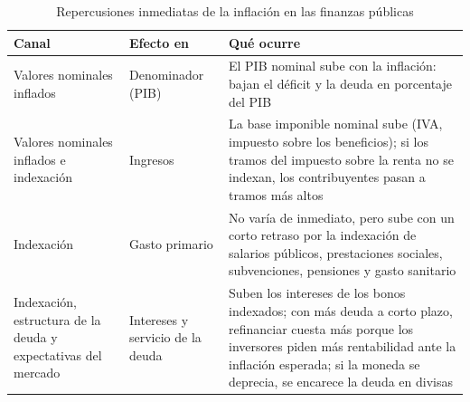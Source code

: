 \documentclass[11pt]{article}
\begin{document}
\begin{table}[!htb]
\centering\small
\caption{Repercusiones inmediatas de la inflación en las finanzas públicas}\label{tab:inflacion-cuentas}
\begin{tabular}{>{\raggedright\arraybackslash}p{3.2cm}>{\raggedright\arraybackslash}p{2.6cm}>{\raggedright\arraybackslash}p{8.6cm}}
\toprule
\rowcolor{tceeazulpalido}
\textbf{Canal} & \textbf{Efecto en} & \textbf{Qué ocurre} \\
\midrule
\rowcolor{tceesalvia}
Valores nominales inflados & Denominador (PIB) & El PIB nominal sube con la inflación: bajan el déficit y la deuda en porcentaje del PIB \\
Valores nominales inflados e indexación & Ingresos & La base imponible nominal sube (IVA, impuesto sobre los beneficios); si los tramos del impuesto sobre la renta no se indexan, los contribuyentes pasan a tramos más altos \\
\rowcolor{tceesalvia}
Indexación & Gasto primario & No varía de inmediato, pero sube con un corto retraso por la indexación de salarios públicos, prestaciones sociales, subvenciones, pensiones y gasto sanitario \\
Indexación, estructura de la deuda y expectativas del mercado & Intereses y servicio de la deuda & Suben los intereses de los bonos indexados; con más deuda a corto plazo, refinanciar cuesta más porque los inversores piden más rentabilidad ante la inflación esperada; si la moneda se deprecia, se encarece la deuda en divisas \\
\bottomrule
\end{tabular}
\end{table}

\begin{infografia}[!htb]
\centering
\caption{Efectos inmediatos de la inflación en las cuentas públicas}\label{figu:inflacion-cuentas}
\end{infografia}
\end{document}
